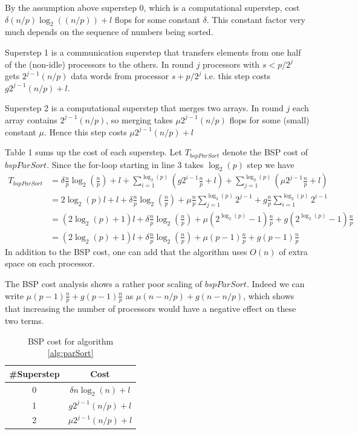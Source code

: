 \documentclass[a4paper,12pt,article]{memoir}
\theoremstyle{plain}
\theoremstyle{definition}
\theoremstyle{remark}
\theoremstyle{plain}
\theoremstyle{remark}
\begin{document}
By the assumption above superstep 0, which is a computational superstep, cost $\delta (n/p)\log_2((n/p))+l$ flops for some constant $\delta$. This constant factor very much depends on the sequence of numbers being sorted. 

Superstep 1 is a communication superstep that transfers elements from one half of the (non-idle) processors to the others. In round $j$ processors with $s<p/2^j$ gets $2^{j-1}(n/p)$ data words from processor $s+p/2^j$ i.e. this step costs $g2^{j-1}(n/p)+l$.

Superstep 2 is a computational superstep that merges two arrays. In round $j$ each array contains $2^{j-1}(n/p)$, so merging takes $\mu 2^{j-1}(n/p)$ flops for some (small) constant $\mu$. Hence this step costs $\mu 2^{j-1}(n/p)+l$

Table 1 sums up the cost of each superstep. Let $T_{bspParSort}$ denote the BSP cost of $bspParSort$. Since the for-loop starting in line 3 takes $\log_2(p)$ step we have
\begin{align*}
T_{bspParSort}&=\delta \frac{n}{p}\log_2\left(\frac{n}{p}\right)+l+\sum_{i=1}^{\log_2(p)}(g2^{i-1}\frac{n}{p}+l)+\sum_{j=1}^{\log_2(p)}(\mu 2^{j-1}\frac{n}{p}+l) \\
&=2\log_2(p)l+l+\delta \frac{n}{p}\log_2\left(\frac{n}{p}\right)+\mu\frac{n}{p}\sum_{j=1}^{\log_2(p)} 2^{j-1}+g\frac{n}{p}\sum_{i=1}^{\log_2(p)}2^{i-1} \\
&=(2\log_2(p)+1)l+\delta\frac{n}{p}\log_2\left(\frac{n}{p}\right)+\mu(2^{\log_2(p)}-1)\frac{n}{p}+g(2^{\log_2(p)}-1)\frac{n}{p} \\
&=(2\log_2(p)+1)l+\delta\frac{n}{p}\log_2\left(\frac{n}{p}\right)+\mu(p-1)\frac{n}{p}+g(p-1)\frac{n}{p}
\end{align*}
In addition to the BSP cost, one can add that the algorithm uses $O(n)$ of extra space on each processor. 

The BSP cost analysis shows a rather poor scaling of $bspParSort$. Indeed we can write $\mu(p-1)\frac{n}{p}+g(p-1)\frac{n}{p}$ as $\mu(n-n/p)+g(n-n/p)$, which shows that increasing the number of processors would have a negative effect on these two terms. 
\begin{table}
\begin{center}
\begin{tabular}{|c|c|}
\hline 
\#Superstep & Cost \\ 
\hline 
0 & $\delta n\log_2(n)+l$ \\ 
\hline 
1 & $g2^{j-1}(n/p)+l$ \\ 
\hline 
2 & $\mu 2^{j-1}(n/p)+l$ \\ 
\hline  
\end{tabular} 
\caption{BSP cost for algorithm \ref{alg:parSort}}
\end{center}
\end{table}
\newpage
\end{document}
